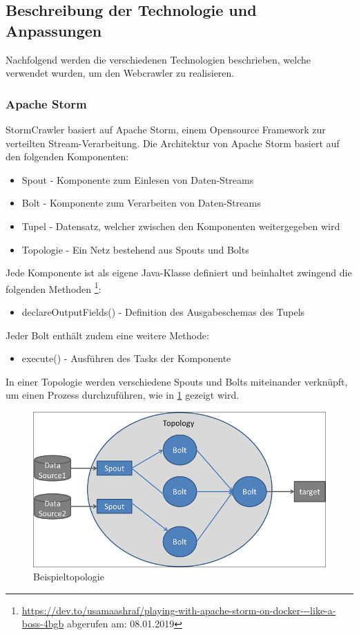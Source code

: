 \subsection{Beschreibung der Technologie und Anpassungen}
Nachfolgend werden die verschiedenen Technologien beschrieben, welche verwendet wurden, um den Webcrawler zu realisieren.
\subsubsection{Apache Storm}
StormCrawler basiert auf Apache Storm, einem Opensource Framework zur verteilten Stream-Verarbeitung.
Die Architektur von Apache Storm basiert auf den folgenden Komponenten:
\begin{itemize}
	\item Spout - Komponente zum Einlesen von Daten-Streams
	\item Bolt - Komponente zum Verarbeiten von Daten-Streams
	\item Tupel - Datensatz, welcher zwischen den Komponenten weitergegeben wird
	\item Topologie - Ein Netz bestehend aus Spouts und Bolts
\end{itemize}
Jede Komponente ist als eigene Java-Klasse definiert und beinhaltet zwingend die folgenden Methoden \footnote{\url{https://dev.to/usamaashraf/playing-with-apache-storm-on-docker---like-a-boss-4bgb} abgerufen am: 08.01.2019}:
\begin{itemize}
	\item declareOutputFields() - Definition des Ausgabeschemas des Tupels
\end{itemize}
Jeder Bolt enthält zudem eine weitere Methode:
\begin{itemize}
	\item execute() - Ausführen des Tasks der Komponente
\end{itemize}
In einer Topologie werden verschiedene Spouts und Bolts miteinander verknüpft, um einen Prozess durchzuführen, wie in \cref{fig:topology} gezeigt wird.
\begin{figure}[H]
	\centering	
	\includegraphics[width=0.8\columnwidth,keepaspectratio]{img/storm-topology.png}
	\caption{Beispieltopologie}
	\label{fig:topology}
\end{figure}
